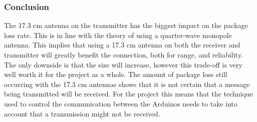 \subsubsection*{Conclusion}
The 17.3 cm antenna on the transmitter has the biggest impact on the package loss rate.
This is in line with the theory of using a quarter-wave monopole antenna.
This implies that using a 17.3 cm antenna on both the receiver and transmitter will greatly benefit the connection, both for range, and reliability.
The only downside is that the size will increase, however this trade-off is very well worth it for the project as a whole.
The amount of package loss still occurring with the 17.3 cm antennas shows that it is not certain that a message being transmitted will be received.
For the project this means that the technique used to control the communication between the Arduinos needs to take into account that a transmission might not be received.

